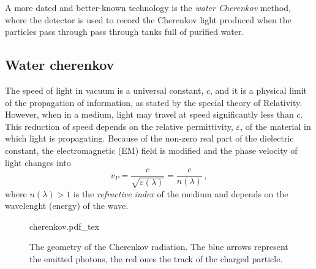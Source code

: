 A more dated and better-known technology is the \emph{water Cherenkov} method, where the detector is used to %
 record the Cherenkov light produced when the particles pass through pass through tanks full of purified water. 

\subsection{Water cherenkov}

 The speed of light in vacuum is a universal constant, $c$, and it is a physical limit of the propagation %
 of information, as stated by the special theory of Relativity.
 However, when in a medium, light may travel at speed significantly less than $c$.
 This reduction of speed depends on the relative permittivity, $\varepsilon$, of the material in which light is %
 propagating.
 Because of the non-zero real part of the dielectric constant, the electromagnetic (EM) field is modified and %
 the phase velocity of light changes into
 \begin{equation}
   \label{eq:light}
   v_P = \frac{c}{\sqrt{\varepsilon(\lambda)}} = \frac{c}{n(\lambda)}\,,
 \end{equation}
 where $n(\lambda) > 1$ is the \emph{refractive index} of the medium and %
 depends on the wavelenght (energy) of the wave.

 \begin{wrapfigure}{R}{0.5\textwidth}
   \centering
   \def\svgwidth{0.4\textwidth}
   {cherenkov.pdf_tex}
   \caption{The geometry of the Cherenkov radiation. The blue arrows represent the emitted photons, the red ones %
   the track of the charged particle.}
   \label{fig:cherenkov}
 \end{wrapfigure}

